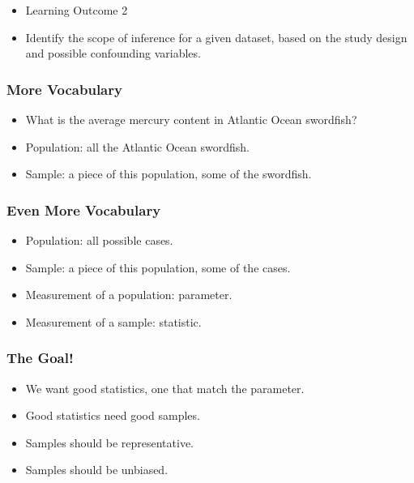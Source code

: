 \documentclass{beamer}
\begin{document}
\begin{frame}
  \begin{itemize}
    \item[] Learning Outcome 2
      \vspace{0.5cm}
    \item[] Identify the scope of inference for a given dataset, based
      on the study design and possible confounding variables. 
  \end{itemize}
\end{frame}

\begin{frame}
  \frametitle{More Vocabulary}
  \begin{itemize}
    \item[] What is the average mercury content in Atlantic Ocean
      swordfish?
      \vspace{0.5cm}
    \item[] Population: all the Atlantic Ocean swordfish.
      \vspace{0.5cm}
    \item[] Sample: a piece of this population, some of the swordfish. 
  \end{itemize}
\end{frame}

\begin{frame}
  \frametitle{Even More Vocabulary}
  \begin{itemize}
    \item[] Population: all possible cases. 
      \vspace{0.5cm}
    \item[] Sample: a piece of this population, some of the cases.
      \vspace{0.5cm}
    \item[] Measurement of a population: parameter. 
      \vspace{0.5cm}
    \item[] Measurement of a sample: statistic. 
  \end{itemize}
\end{frame}

\begin{frame}
  \frametitle{The Goal!}
  \begin{itemize}
    \item[] We want good statistics, one that match the parameter.
      \vspace{0.5cm}
    \item[] Good statistics need good samples.
      \vspace{0.5cm}
    \item[] Samples should be representative. 
      \vspace{0.5cm}
    \item[] Samples should be unbiased. 
  \end{itemize}
\end{frame}
\end{document}
